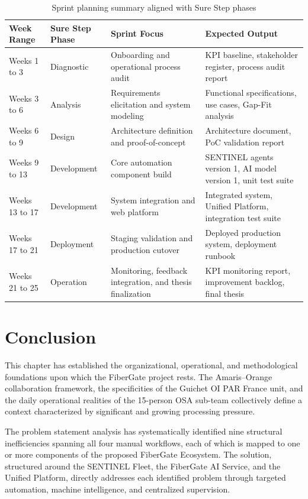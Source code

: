 \begin{table}[H]
  \centering
  \caption{Sprint planning summary aligned with Sure Step phases}
  \renewcommand{\arraystretch}{1.0}
  \footnotesize
  \begin{tabularx}{\textwidth}{|>{\raggedright\arraybackslash}p{2.3cm}|X|X|X|}
    \hline
    \textbf{Week Range} & \textbf{Sure Step Phase} & \textbf{Sprint Focus} & \textbf{Expected Output} \\ \hline
    Weeks 1 to 3 & Diagnostic & Onboarding and operational process audit & KPI baseline, stakeholder register, process audit report \\ \hline
    Weeks 3 to 6 & Analysis & Requirements elicitation and system modeling & Functional specifications, use cases, Gap-Fit analysis \\ \hline
    Weeks 6 to 9 & Design & Architecture definition and proof-of-concept & Architecture document, PoC validation report \\ \hline
    Weeks 9 to 13 & Development & Core automation component build & SENTINEL agents version 1, AI model version 1, unit test suite \\ \hline
    Weeks 13 to 17 & Development & System integration and web platform & Integrated system, Unified Platform, integration test suite \\ \hline
    Weeks 17 to 21 & Deployment & Staging validation and production cutover & Deployed production system, deployment runbook \\ \hline
    Weeks 21 to 25 & Operation & Monitoring, feedback integration, and thesis finalization & KPI monitoring report, improvement backlog, final thesis \\ \hline
  \end{tabularx}
\end{table}

\section*{Conclusion}

This chapter has established the organizational, operational, and methodological foundations upon which the FiberGate project rests. The Amaris--Orange collaboration framework, the specificities of the Guichet OI PAR France unit, and the daily operational realities of the 15-person OSA sub-team collectively define a context characterized by significant and growing processing pressure.

The problem statement analysis has systematically identified nine structural inefficiencies spanning all four manual workflows, each of which is mapped to one or more components of the proposed FiberGate Ecosystem. The solution, structured around the SENTINEL Fleet, the FiberGate AI Service, and the Unified Platform, directly addresses each identified problem through targeted automation, machine intelligence, and centralized supervision.

